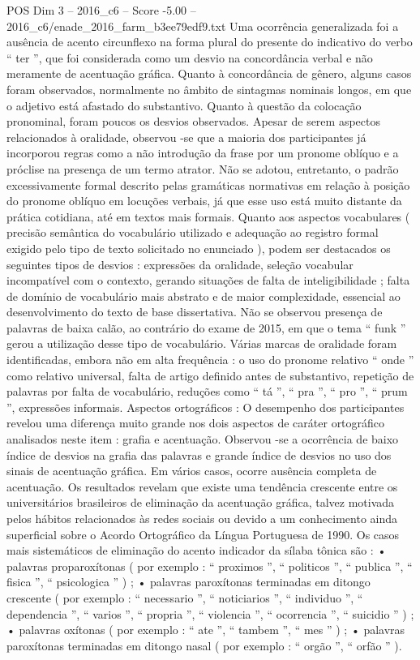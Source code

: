 \begin{textsample}{POS Dim 3 – 2016\_c6 – Score -5.00 – 2016\_c6/enade\_2016\_farm\_b3ee79edf9.txt}
Uma ocorrência generalizada foi a ausência de acento circunflexo na forma plural do presente do indicativo do verbo “ ter ”, que foi considerada como um desvio na concordância verbal e não meramente de acentuação gráfica.
Quanto à concordância de gênero, alguns casos foram observados, normalmente no âmbito de sintagmas nominais longos, em que o adjetivo está afastado do substantivo.
Quanto à questão da colocação pronominal, foram poucos os desvios observados.
Apesar de serem aspectos relacionados à oralidade, observou -se que a maioria dos participantes já incorporou regras como a não introdução da frase por um pronome oblíquo e a próclise na presença de um termo atrator.
Não se adotou, entretanto, o padrão excessivamente formal descrito pelas gramáticas normativas em relação à posição do pronome oblíquo em locuções verbais, já que esse uso está muito distante da prática cotidiana, até em textos mais formais.
Quanto aos aspectos vocabulares ( precisão semântica do vocabulário utilizado e adequação ao registro formal exigido pelo tipo de texto solicitado no enunciado ), podem ser destacados os seguintes tipos de desvios : expressões da oralidade, seleção vocabular incompatível com o contexto, gerando situações de falta de inteligibilidade ; falta de domínio de vocabulário mais abstrato e de maior complexidade, essencial ao desenvolvimento do texto de base dissertativa.
Não se observou presença de palavras de baixa calão, ao contrário do exame de 2015, em que o tema “ funk ” gerou a utilização desse tipo de vocabulário.
Várias marcas de oralidade foram identificadas, embora não em alta frequência : o uso do pronome relativo “ onde ” como relativo universal, falta de artigo definido antes de substantivo, repetição de palavras por falta de vocabulário, reduções como “ tá ”, “ pra ”, “ pro ”, “ prum ”, expressões informais.
Aspectos ortográficos : O desempenho dos participantes revelou uma diferença muito grande nos dois aspectos de caráter ortográfico analisados neste item : grafia e acentuação.
Observou -se a ocorrência de baixo índice de desvios na grafia das palavras e grande índice de desvios no uso dos sinais de acentuação gráfica.
Em vários casos, ocorre ausência completa de acentuação.
Os resultados revelam que existe uma tendência crescente entre os universitários brasileiros de eliminação da acentuação gráfica, talvez motivada pelos hábitos relacionados às redes sociais ou devido a um conhecimento ainda superficial sobre o Acordo Ortográfico da Língua Portuguesa de 1990.
Os casos mais sistemáticos de eliminação do acento indicador da sílaba tônica são : • palavras proparoxítonas ( por exemplo : “ proximos ”, “ politicos ”, “ publica ”, “ fisica ”, “ psicologica ” ) ; • palavras paroxítonas terminadas em ditongo crescente ( por exemplo : “ necessario ”, “ noticiarios ”, “ individuo ”, “ dependencia ”, “ varios ”, “ propria ”, “ violencia ”, “ ocorrencia ”, “ suicidio ” ) ; • palavras oxítonas ( por exemplo : “ ate ”, “ tambem ”, “ mes ” ) ; • palavras paroxítonas terminadas em ditongo nasal ( por exemplo : “ orgão ”, “ orfão ” ).

\end{textsample}
